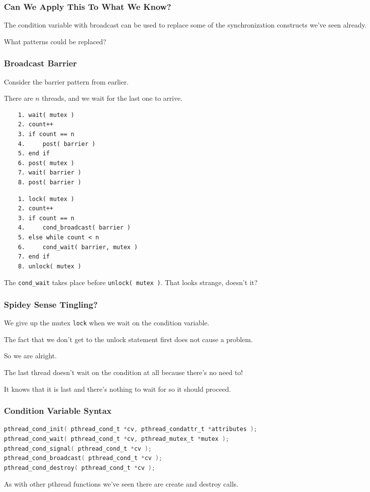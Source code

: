 \begin{frame}
	\frametitle{Can We Apply This To What We Know?}

	The condition variable with broadcast can be used to replace some of the synchronization constructs we've seen already.

	What patterns could be replaced?

\end{frame}

\begin{frame}[fragile]
	\frametitle{Broadcast Barrier}

	Consider the barrier pattern from earlier.

	There are $n$ threads, and we wait for the last one to arrive.
		{\scriptsize
			\begin{multicols}{2}
				\begin{verbatim}
	1. wait( mutex )
	2. count++
	3. if count == n
	4.     post( barrier )
	5. end if
	6. post( mutex )
	7. wait( barrier )
	8. post( barrier )
  				\end{verbatim}
				\columnbreak
				\begin{verbatim}
	1. lock( mutex )
	2. count++
	3. if count == n
	4.     cond_broadcast( barrier )
	5. else while count < n
	6.     cond_wait( barrier, mutex )
	7. end if
	8. unlock( mutex )
  				\end{verbatim}
			\end{multicols}
		}

	The \texttt{cond\_wait} takes place before \texttt{unlock( mutex )}. That looks strange, doesn't it?

\end{frame}


\begin{frame}
	\frametitle{Spidey Sense Tingling?}


	We give up the mutex \texttt{lock} when we wait on the condition variable.

	The fact that we don't get to the unlock statement first does not cause a problem.

	So we are alright.

	The last thread doesn't wait on the condition at all because there's no need to!

	It knows that it is last and there's nothing to wait for so it should proceed.

\end{frame}


\begin{frame}[fragile]
	\frametitle{Condition Variable Syntax}

	\begin{lstlisting}[language=C]
pthread_cond_init( pthread_cond_t *cv, pthread_condattr_t *attributes );
pthread_cond_wait( pthread_cond_t *cv, pthread_mutex_t *mutex );
pthread_cond_signal( pthread_cond_t *cv );
pthread_cond_broadcast( pthread_cond_t *cv );
pthread_cond_destroy( pthread_cond_t *cv );
\end{lstlisting}

	As with other pthread functions we've seen there are create and destroy calls.

\end{frame}

